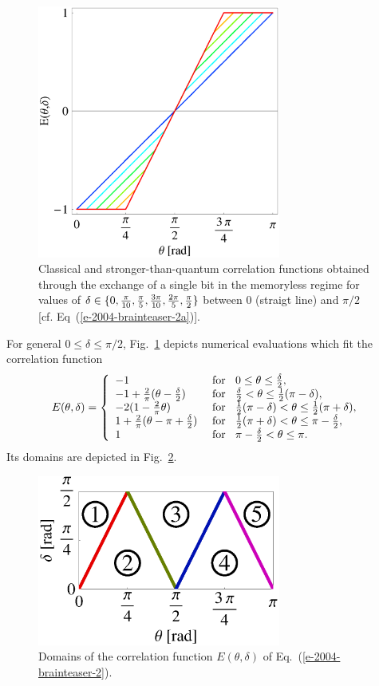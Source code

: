 \documentclass[prl,showpacs,showkeys,amsfonts,preprint]{revtex4}
\begin{document}
\begin{figure}[htbp]
  \centering
  \includegraphics[width=80mm]{2004-brainteaser-f2a}
  \caption{Classical and stronger-than-quantum correlation functions
obtained through the exchange of a single
bit in the memoryless regime for values of $\delta \in \{0,
{\pi \over 10},
{\pi \over 5},
{3\pi \over 10},
{2\pi \over 5},
{\pi \over 2}\}$ between $0$ (straigt line) and $\pi /2$ [cf. Eq~(\ref{e-2004-brainteaser-2a})].}
  \label{2004-brainteaser-f2}
\end{figure}
For general $0\le \delta \le \pi /2$, Fig.~\ref{2004-brainteaser-f2} depicts numerical evaluations
which  fit the correlation function
\begin{equation}
E(\theta ,\delta )= \left\{
\begin{array}{ll}
-1 & \text{ for } \;\; 0\le \theta \le {\delta \over 2} ,  \\
-1 +{2\over \pi}(\theta -{\delta \over 2} )&\text{ for } \;\; {\delta \over 2} < \theta \le {1 \over 2}(\pi - \delta) ,   \\
-2(1-{2 \over \pi } \theta ) &\text{ for } \; \; {1 \over 2}(\pi - \delta) < \theta \le {1 \over 2}(\pi   + \delta ) , \\
1+ {2\over \pi }(\theta-\pi +{\delta \over 2} ) &\text{ for } \;\; {1 \over 2}(\pi   + \delta )  < \theta \le \pi - {\delta \over 2} , \\
1 & \text{ for } \;\; \pi - {\delta \over 2} < \theta \le \pi .
\end{array}        \right.
\label{e-2004-brainteaser-2}
\end{equation}
Its domains are depicted in Fig.~\ref{2004-brainteaser-f2b}.
\begin{figure}[htbp]
  \centering
  \includegraphics[width=80mm]{2004-brainteaser-f2b}
  \caption{Domains of the correlation function $E(\theta ,\delta )$ of Eq.~(\ref{e-2004-brainteaser-2}).}
  \label{2004-brainteaser-f2b}
\end{figure}
\end{document}

